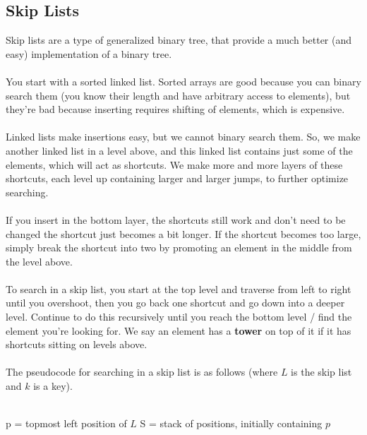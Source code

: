 \documentclass[]{article}
\theoremstyle{definition}
\newcommand{\lecture}[1]{\marginpar{{\footnotesize $\leftarrow$ \underline{#1}}}}
\begin{document}
		\subsection{Skip Lists}
			Skip lists are a type of generalized binary tree, that provide a much better (and easy) implementation of a binary tree. 
			\\ \\
			You start with a sorted linked list. Sorted arrays are good because you can binary search them (you know their length and have arbitrary access to elements), but they're bad because inserting requires shifting of elements, which is expensive.
			\\ \\
			Linked lists make insertions easy, but we cannot binary search them. So, we make another linked list in a level above, and this linked list contains just some of the elements, which will act as shortcuts. We make more and more layers of these shortcuts, each level up containing larger and larger jumps, to further optimize searching.
			\\ \\
			If you insert in the bottom layer, the shortcuts still work and don't need to be changed \textendash{} the shortcut just becomes a bit longer. If the shortcut becomes too large, simply break the shortcut into two by promoting an element in the middle from the level above. \lecture{March 12, 2013}
			\\ \\
			To search in a skip list, you start at the top level and traverse from left to right until you overshoot, then you go back one shortcut and go down into a deeper level. Continue to do this recursively until you reach the bottom level / find the element you're looking for. We say an element has a \textbf{tower} on top of it if it has shortcuts sitting on levels above.
			\\ \\
			The pseudocode for searching in a skip list is as follows (where $L$ is the skip list and $k$ is a key). \\ \\
			\begin{algorithm}[H]
				p = topmost left position of $L$\;
				S = stack of positions, initially containing $p$\;
			\end{algorithm}
\end{document}
